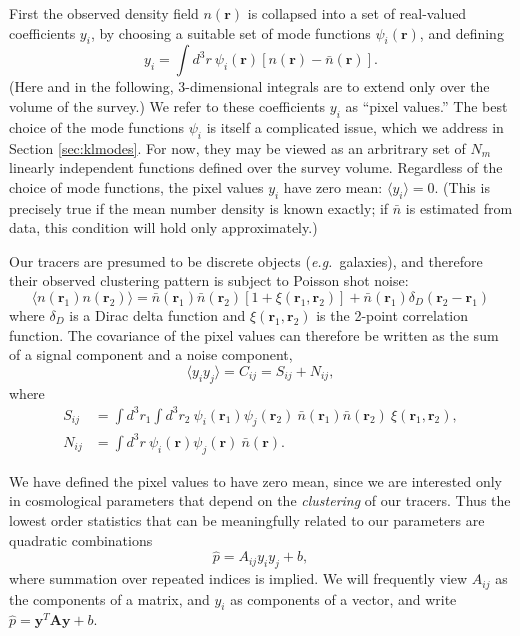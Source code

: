 \documentclass{article}
\newcommand{\eg}{\textit{e.g.}}
\renewcommand{\vec}[1]{\bm{#1}}
\newcommand{\mat}[1]{\mathbf{#1}}
\renewcommand{\r}{\vec{r}}
\begin{document}
First the observed density field $n(\r)$ is collapsed into a set of real-valued
coefficients $y_i$, by choosing a suitable set of mode functions
$\psi_i(\r)$, and defining
\begin{equation}
    y_i = \int d^3r~ \psi_i(\r) [n(\r) - \bar{n}(\r)].
\end{equation}
(Here and in the following, 3-dimensional integrals are to extend only over the
volume of the survey.)  We refer to these coefficients $y_i$ as ``pixel
values.''  The best choice of the mode functions $\psi_i$ is itself a
complicated issue, which we address in Section \ref{sec:klmodes}.  For now,
they may be viewed as an arbritrary set of $N_m$ linearly independent functions
defined over the survey volume.  Regardless of the choice of mode functions,
the pixel values $y_i$ have zero mean: $\langle y_i \rangle = 0$.  (This is
precisely true if the mean number density is known exactly; if $\bar{n}$ is
estimated from data, this condition will hold only approximately.)

Our tracers are presumed to be discrete objects (\eg~galaxies), and therefore
their observed clustering pattern is subject to Poisson shot noise:
\begin{equation}
    \langle n(\r_1) n(\r_2) \rangle =
        \bar{n}(\r_1) \bar{n}(\r_2) [1 + \xi(\r_1,\r_2)]
      + \bar{n}(\r_1) \delta_D(\r_2-\r_1)
\end{equation}
where $\delta_D$ is a Dirac delta function and $\xi(\r_1,\r_2)$ is the 2-point
correlation function.  The covariance of the pixel values can therefore be
written as the sum of a signal component and a noise component,
\begin{equation}
\label{eq:yiyj}
    \langle y_i y_j \rangle = C_{ij} = S_{ij} + N_{ij},
\end{equation}
where
\begin{align}
\label{eq:signal}
    S_{ij} &= \int d^3r_1 \int d^3r_2~ \psi_i(\r_1) \psi_j(\r_2)~ \bar{n}(\r_1) \bar{n}(\r_2)~ \xi(\r_1,\r_2), \\
\label{eq:noise}
    N_{ij} &= \int d^3r~ \psi_i(\r) \psi_j(\r)~ \bar{n}(\r).
\end{align}

We have defined the pixel values to have zero mean, since we are interested
only in cosmological parameters that depend on the \emph{clustering} of our
tracers.  Thus the lowest order statistics that can be meaningfully related
to our parameters are quadratic combinations
\begin{equation}
    \hat{p} = A_{ij} y_i y_j + b,
\end{equation}
where summation over repeated indices is implied.  We will frequently view
$A_{ij}$ as the components of a matrix, and $y_i$ as components of a vector,
and write $\hat{p} = \mat{y}^T \mat{A} \mat{y} + b$.
\end{document}
